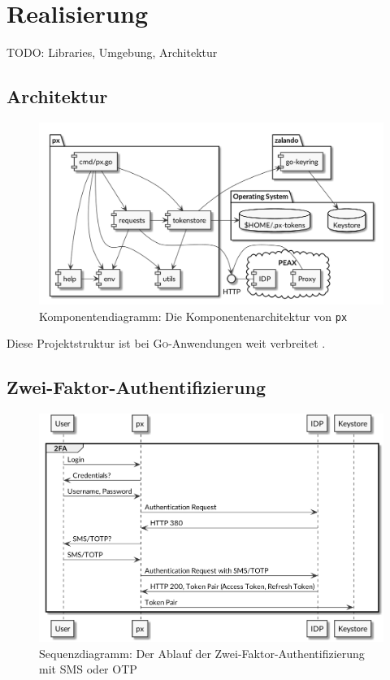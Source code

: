 \section{Realisierung}
\label{sec:Realisierung}

TODO: Libraries, Umgebung, Architektur

\subsection{Architektur}

\begin{figure}
    \centering
    \includegraphics[width=\linewidth]{pics/komponentendiagramm.png}
    \caption{Komponentendiagramm: Die Komponentenarchitektur von \texttt{px}}
\end{figure}

Diese Projektstruktur ist bei \textsc{Go}-Anwendungen weit verbreitet \cite[p. 12]{powerful-cli-apps-in-go}.

\subsection{Zwei-Faktor-Authentifizierung}

\begin{figure}
    \centering
    \includegraphics[width=\linewidth]{pics/sequence-2fa.png}
    \caption{Sequenzdiagramm: Der Ablauf der Zwei-Faktor-Authentifizierung mit SMS oder OTP}
\end{figure}

